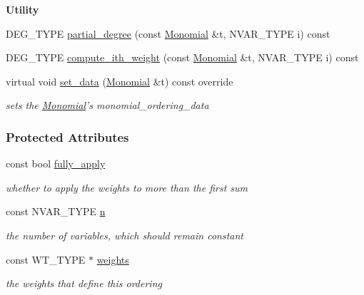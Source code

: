 \begin{Indent}\textbf{ Utility}\par
\begin{DoxyCompactItemize}
\item 
D\+E\+G\+\_\+\+T\+Y\+PE \hyperlink{group__orderinggroup_af04f39af33cba2c1c4f985e57ea8d136}{partial\+\_\+degree} (const \hyperlink{group__polygroup_class_monomial}{Monomial} \&t, N\+V\+A\+R\+\_\+\+T\+Y\+PE i) const
\item 
D\+E\+G\+\_\+\+T\+Y\+PE \hyperlink{group__orderinggroup_a960a5b3460c4cab0dfd89bc0663c6ee0}{compute\+\_\+ith\+\_\+weight} (const \hyperlink{group__polygroup_class_monomial}{Monomial} \&t, N\+V\+A\+R\+\_\+\+T\+Y\+PE i) const
\item 
\mbox{\label{group__orderinggroup_a65f1e27ee52413c91ffcb87632dcb27c}} 
virtual void \hyperlink{group__orderinggroup_a65f1e27ee52413c91ffcb87632dcb27c}{set\+\_\+data} (\hyperlink{group__polygroup_class_monomial}{Monomial} \&t) const override
\begin{DoxyCompactList}\small\item\em sets the \hyperlink{group__polygroup_class_monomial}{Monomial}'s {\ttfamily monomial\+\_\+ordering\+\_\+data} \end{DoxyCompactList}\end{DoxyCompactItemize}
\end{Indent}
\subsubsection*{Protected Attributes}
\begin{DoxyCompactItemize}
\item 
\mbox{\label{group__orderinggroup_a1673ac75841fe8203941c73030621579}} 
const bool \hyperlink{group__orderinggroup_a1673ac75841fe8203941c73030621579}{fully\+\_\+apply}
\begin{DoxyCompactList}\small\item\em whether to apply the weights to more than the first sum \end{DoxyCompactList}\item 
\mbox{\label{group__orderinggroup_a2857c72d3d83c1ec4dfaea5dc6fb4893}} 
const N\+V\+A\+R\+\_\+\+T\+Y\+PE \hyperlink{group__orderinggroup_a2857c72d3d83c1ec4dfaea5dc6fb4893}{n}
\begin{DoxyCompactList}\small\item\em the number of variables, which should remain constant \end{DoxyCompactList}\item 
\mbox{\label{group__orderinggroup_adb595ee1755d11ab65164222c7ec2d94}} 
const W\+T\+\_\+\+T\+Y\+PE $\ast$ \hyperlink{group__orderinggroup_adb595ee1755d11ab65164222c7ec2d94}{weights}
\begin{DoxyCompactList}\small\item\em the weights that define this ordering \end{DoxyCompactList}\end{DoxyCompactItemize}
